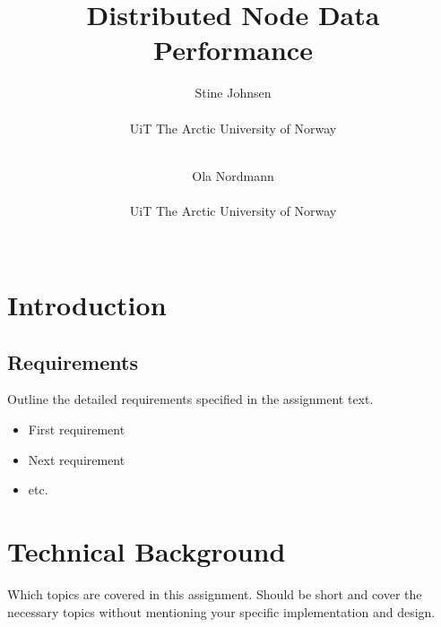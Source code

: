 



\title {Distributed Node Data Performance}
\author {%
    Stine Johnsen \\
    \begin{affiliation}
        UiT The Arctic University of Norway
    \end{affiliation} \\
    \and
    Ola Nordmann \\
    \begin{affiliation}
        UiT The Arctic University of Norway
    \end{affiliation} \\
}

\maketitle


\begin{abstract}
    \blindtext
\end{abstract}

\section{Introduction}



\subsection{Requirements}

Outline the detailed requirements specified in the assignment text.

\begin{itemize}

\item First requirement
\item Next requirement
\item etc.

\end{itemize}


\section{Technical Background}

Which topics are covered in this assignment. Should be short and cover the
necessary topics without mentioning your specific implementation and design.

